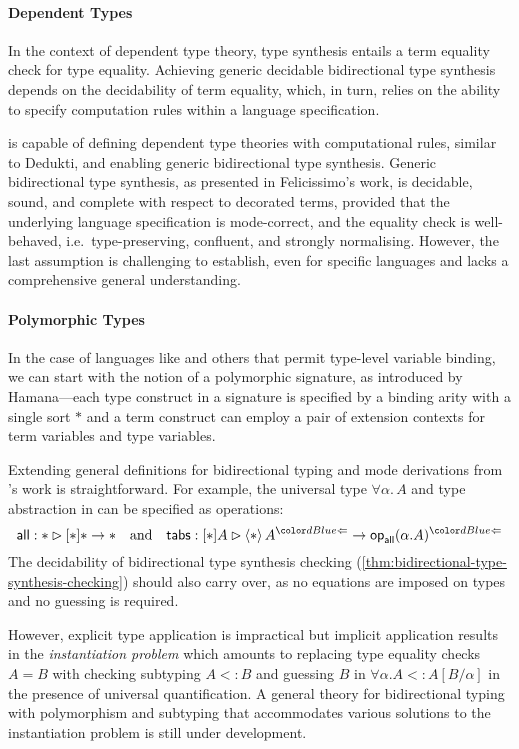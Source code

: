 \paragraph{Dependent Types}
In the context of dependent type theory, type synthesis entails a term equality check for type equality.
Achieving generic decidable bidirectional type synthesis depends on the decidability of term equality, which, in turn, relies on the ability to specify computation rules within a language specification.

 is capable of defining dependent type theories with computational rules, similar to Dedukti, and enabling generic bidirectional type synthesis.
Generic bidirectional type synthesis, as presented in Felicissimo's work, is decidable, sound, and complete with respect to decorated terms, provided that the underlying language specification is mode-correct, and the equality check is well-behaved, i.e.\ type-preserving, confluent, and strongly normalising.
However, the last assumption is challenging to establish, even for specific languages and lacks a comprehensive general understanding.

\paragraph{Polymorphic Types}
In the case of languages like \SystemF and others that permit type-level variable binding, we can start with the notion of a polymorphic signature, as introduced by Hamana---each type construct in a signature is specified by a binding arity with a single sort $*$ and a term construct can employ a pair of extension contexts for term variables and type variables.

Extending general definitions for bidirectional typing and mode derivations from \citeauthor{Hamana2011}'s work is straightforward. 
For example, the universal type $\forall \alpha.\, A$ and type abstraction in \SystemF can be specified as operations:
\[
\mathsf{all} : * \rhd [*] * \to *
\quad\text{and}\quad
\mathsf{tabs} : [*] A \rhd \left< * \right> A^{\chk} \to \tyOp_{\mathsf{all}}(\alpha. A)^{\chk}
\]
The decidability of bidirectional type synthesis checking (\cref{thm:bidirectional-type-synthesis-checking}) should also carry over, as no equations are imposed on types and no guessing is required.

However, explicit type application is impractical but implicit application results in the \emph{instantiation problem} which amounts to replacing type equality checks $A = B$ with checking subtyping $A <: B$ and guessing $B$ in $\forall \alpha. A <: A[B/\alpha]$ in the presence of universal quantification.
A general theory for bidirectional typing with polymorphism and subtyping that accommodates various solutions to the instantiation problem is still under development.

